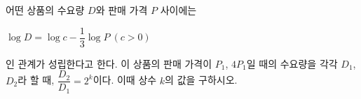 어떤 상품의 수요량 $D$와 판매 가격 $P$ 사이에는 \par\smallskip\noindent\hspace*{1.5em}$\log D=\log c-\dfrac{1}{3}\log P\ (c>0)$\par\smallskip\noindent 인 관계가 성립한다고 한다. 이 상품의 판매 가격이 $P_1$, $4P_1$일 때의 수요량을 각각 $D_1$, $D_2$라 할 때, $\dfrac{D_2}{D_1}=2^k$이다. 이때 상수 $k$의 값을 구하시오.
